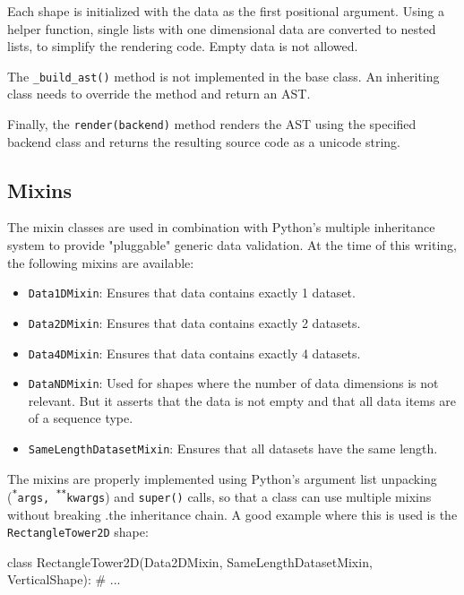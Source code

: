 Each shape is initialized with the data as the first positional argument. Using
a helper function, single lists with one dimensional data are converted to
nested lists, to simplify the rendering code. Empty data is not allowed.

The \texttt{\_build\_ast()} method is not implemented in the base class. An
inheriting class needs to override the method and return an AST.

Finally, the \texttt{render(backend)} method renders the AST using the specified
backend class and returns the resulting source code as a unicode string.

\subsection{Mixins}

The mixin classes are used in combination with Python's multiple inheritance
system to provide "pluggable" generic data validation. At the time of this
writing, the following mixins are available:

\begin{itemize}
	\item \texttt{Data1DMixin}: Ensures that data contains exactly 1 dataset.
	\item \texttt{Data2DMixin}: Ensures that data contains exactly 2 datasets.
	\item \texttt{Data4DMixin}: Ensures that data contains exactly 4 datasets.
	\item \texttt{DataNDMixin}: Used for shapes where the number of data
		dimensions is not relevant. But it asserts that the data is not empty and
		that all data items are of a sequence type.
	\item \texttt{SameLengthDatasetMixin}: Ensures that all datasets have the same
		length.
\end{itemize}

The mixins are properly implemented using Python's argument list unpacking
(\texttt{\textsuperscript{*}args, \textsuperscript{**}kwargs}) and
\texttt{super()} calls, so that a class can use multiple mixins without breaking
.the inheritance chain. A good example where this is used is the
\texttt{RectangleTower2D} shape:

\vspace{.5\baselineskip}

\begin{pythoncode}
class RectangleTower2D(Data2DMixin,
    SameLengthDatasetMixin, VerticalShape):
    # ...
\end{pythoncode}

